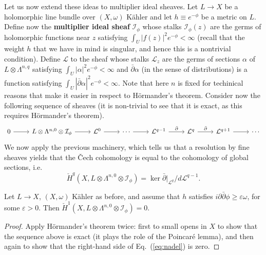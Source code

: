 \documentclass{../mathnotes}
\begin{document}
Let us now extend these ideas to multiplier ideal sheaves. Let $L\to X$ be a holomorphic line bundle over $(X,\omega)$ K\"ahler
and let $h\equiv e^{-\phi}$ be a metric on $L$. Define now the \textbf{multiplier ideal sheaf} $\mathcal{I}_{\phi}$ whose stalks $\mathcal{I}_\phi(z)$ are
the germs of holomorphic functions near $z$ satisfying $\int_U|f(z)|^2e^{-\phi}<\infty$ (recall that the weight $h$ that we have
in mind is singular, and hence this is a nontrivial condition).
Define $\mathcal{L}$ to the sheaf whose stalks $\mathcal{L}_z$ are the germs of sections $\alpha$ of $L\otimes \Lambda^{n,q}$
satisfying $\int_U|\alpha|^2e^{-\phi}<\infty$ and $\bar\partial\alpha$ (in the sense of distributions) is a function satisfying
$\int_U|\bar\partial\alpha|^2e^{-\phi}<\infty$. Note that here $n$ is fixed for techinical reasons that make it easier in respect
to H\"ormander's theorem.
Consider now the following sequence of sheaves (it is non-trivial to see that it is exact, as this requires H\"ormander's theorem).
\begin{equation}
    \begin{tikzcd}
        0\arrow{r}&L\otimes\Lambda^{n,0}\otimes\mathcal{I}_\phi\arrow{r}&\mathcal{L}^0\arrow{r}&\cdots\arrow{r}&\mathcal{L}^{q-1}\arrow{r}{\bar\partial}&\mathcal{L}^{q}\arrow{r}{\bar\partial}&\mathcal{L}^{q+1}\arrow{r}&\cdots
    \end{tikzcd}
    \label{les3}
\end{equation}
We now apply the previous machinery, which tells us that a resolution by fine sheaves yields that the \v{C}ech cohomology
is equal to the cohomology of global sections, i.e.
\begin{equation}
    \check H^q(X,L\otimes\Lambda^{n,0}\otimes\mathcal{I}_\phi)=\ker\bar\partial|_{\mathcal{L}^q}/d\mathcal{L}^{q-1}.
    \label{eq:nadel}
\end{equation}

\begin{thm}
    Let $L\to X$, $(X,\omega)$ K\"ahler as before, and assume that $h$ satisfies $i\partial\bar\partial\phi\geq\varepsilon\omega$,
    for some $\varepsilon>0$. Then $\check H^1(X,L\otimes \Lambda^{n,0}\otimes\mathcal{I}_\phi)=0$.
\end{thm}
\begin{proof}
    Apply H\"ormander's theorem twice: first to small opens in $X$ to show that the sequence above is exact
    (it plays the role of the Poincar\'e lemma), and then again to show that the right-hand side of Eq.~(\ref{eq:nadel})
    is zero.
\end{proof}
\end{document}
